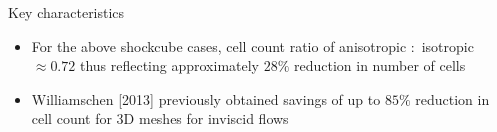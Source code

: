 \documentclass{beamer}
\begin{document}
\begin{frame}
\begin{minipage}[t][1\textheight]{1\textwidth}
\begin{exampleblock}{Key characteristics}
\begin{figure}
\end{figure}
\vspace{-15pt}
\begin{itemize}
\tiny
\item For the above shockcube cases, cell count ratio of anisotropic $:$ isotropic $\approx 0.72$ thus reflecting approximately $28 \%$ reduction in number of cells
\item Williamschen [2013] previously obtained savings of up to $85 \%$ reduction in cell count for 3D meshes for inviscid flows
\end{itemize}
\end{exampleblock}
\end{minipage}

\end{frame}







\end{document}
